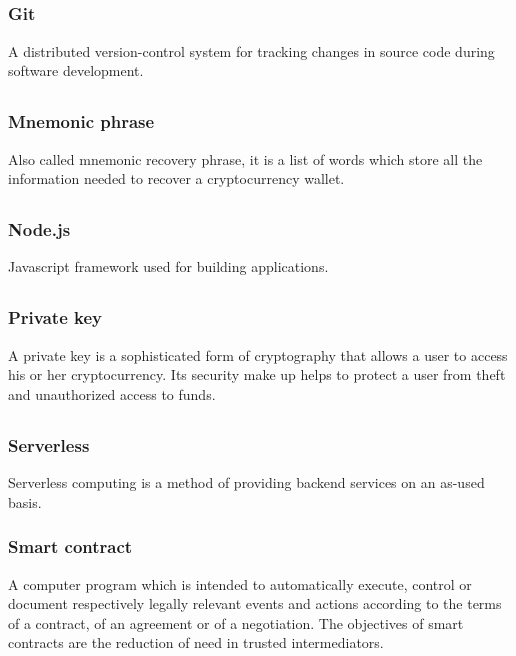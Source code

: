 	\subsection*{}
		\subsubsection*{Git}
			A distributed version-control system for tracking changes in source code during software development.
			
	\subsection*{}
		\subsubsection*{Mnemonic phrase}
			Also called mnemonic recovery phrase, it is a list of words which store all the information needed to recover a cryptocurrency wallet.
	
	\subsection*{}
		\subsubsection*{Node.js}
			Javascript framework used for building applications. 
	
	\subsection*{}
		\subsubsection*{Private key}
			A private key is a sophisticated form of cryptography that allows a user to access his or her cryptocurrency. Its security make up helps to protect a user from theft and unauthorized access to funds.
	
	\subsection*{}
		\subsubsection*{Serverless}
			Serverless computing is a method of providing backend services on an as-used basis.
		\subsubsection*{Smart contract}
			A computer program which is intended to automatically execute, control or document respectively legally relevant events and actions according to the terms of a contract, of an agreement or of a negotiation. The objectives of smart contracts are the reduction of need in trusted intermediators. 